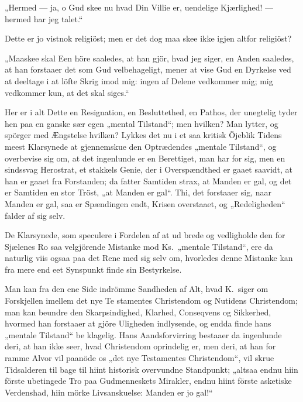 \documentclass[12pt,a4paper]{article}
\newcommand{\opage}[1]{\marginnote{\footnotesize\textit{[#1]}}}
\begin{document}
„Hermed --- ja, o Gud skee nu hvad Din Villie er,
uendelige Kjærlighed! --- hermed har jeg talet.“

Dette er jo vistnok religiöst; men er det dog maa\-%
skee ikke igjen altfor religiöst?

„Maaskee skal Een höre saaledes, at han gjör, hvad
jeg siger, en Anden saaledes, at han forstaaer det som
Gud velbehageligt, mener at vise Gud en Dyrkelse ved
at deeltage i at löfte Skrig imod mig: ingen af Delene
vedkommer mig; mig vedkommer kun, at det skal siges.“

Her er i alt Dette en Resignation, en Besluttethed,
en Pathos, der unegtelig tyder hen paa en ganske sær\-%
egen „mental Tilstand“; men hvilken? Man lytter, og
\opage{3} %
spörger med Ængstelse hvilken? Lykkes det nu i et saa
kritisk Öjeblik Tidens meest Klarsynede at gjennemskue
den Optrædendes „mentale Tilstand“, og overbevise sig
om, at det ingenlunde er en Berettiget, man har for sig,
men en sindssvag Herostrat, et stakkels Genie, der i
Overspændthed er gaaet saavidt, at han er gaaet fra
Forstanden; da fatter Samtiden strax, at Manden er gal, og
det er Samtiden en stor Tröst, „at Manden er gal“. Thi, det
forstaaer sig, naar Manden er gal, saa er Spændingen
endt, Krisen overstaaet, og „Redeligheden“ falder af
sig selv.

De Klarsynede, som speculere i Fordelen af at ud\-%
brede og vedligholde den for Sjælenes Ro saa velgjörende
Mistanke mod Ks.\ „mentale Tilstand“, ere da naturlig\-%
viis ogsaa paa det Rene med sig selv om, hvorledes
denne Mistanke kan fra mere end eet Synspunkt finde
sin Bestyrkelse.

Man kan fra den ene Side indrömme Sandheden af
Alt, hvad K.\ siger om Forskjellen imellem det nye Te\-%
stamentes Christendom og Nutidens Christendom; man
kan beundre den Skarpsindighed, Klarhed, Conseqvens
og Sikkerhed, hvormed han forstaaer at gjöre Uligheden
indlysende, og endda finde hans „mentale Tilstand“ be\-%
klagelig. Hans Aandsforvirring bestaaer da ingenlunde
deri, at han ikke seer, hvad Christendom oprindelig er,
men deri, at han for ramme Alvor vil paanöde os „det
nye Testamentes Christendom“, vil skrue Tidsalderen til\-%
bage til hiint historisk overvundne Standpunkt; „altsaa
endnu hiin förste ubetingede Tro paa Gudmenneskets
Mirakler, endnu hiint förste asketiske Verdenshad, hiin
mörke Livsanskuelse: Manden er jo gal!“
\end{document}
